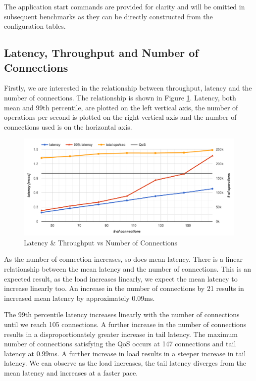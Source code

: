 The application start commands are provided for clarity and will be omitted in subsequent benchmarks as they can be directly constructed from the configuration tables.

\subsection{Latency, Throughput and Number of Connections}

Firstly, we are interested in the relationship between throughput, latency and the number of connections. The relationship is shown in Figure \ref{fig:memcached-default-latency-vs-ops}. Latency, both mean and 99th percentile, are plotted on the left vertical axis, the number of operations per second is plotted on the right vertical axis and the number of connections used is on the horizontal axis.

\begin{figure}[h]
    \includegraphics[width=\textwidth]{./res2/m_baseline_latency.png}
    \caption{Latency \& Throughput vs Number of Connections}
    \label{fig:memcached-default-latency-vs-ops}
\end{figure}

As the number of connection increases, so does mean latency. There is a linear relationship between the mean latency and the number of connections. This is an expected result, as the load increases linearly, we expect the mean latency to increase linearly too. An increase in the number of connections by 21 results in increased mean latency by approximately 0.09ms.

The 99th percentile latency increases linearly with the number of connections until we reach 105 connections. A further increase in the number of connections results in a disproportionately greater increase in tail latency. The maximum number of connections satisfying the QoS occurs at 147 connections and tail latency at 0.99ms. A further increase in load results in a steeper increase in tail latency. We can observe as the load increases, the tail latency diverges from the mean latency and increases at a faster pace.

